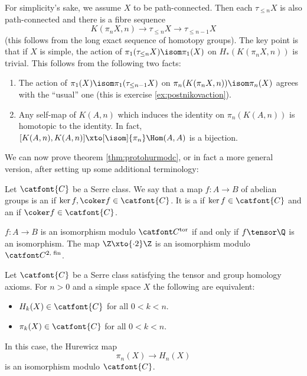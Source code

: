 For simplicity's sake, we assume $X$ to be path-connected.
Then each $\tau_{\leq n} X$ is also path-connected and there is a fibre sequence
\begin{equation*}
	K(\pi_n X, n) \to \tau_{\leq n} X \to \tau_{\leq n - 1} X
\end{equation*}
(this follows from the long exact sequence of homotopy groups).
The key point is that if $X$ is simple, the action of $\pi_1(\tau_{\leq n} X) \isom \pi_1(X)$ on $H_*(K(\pi_n X, n))$ is trivial.
This follows from the following two facts:
\begin{enumerate}
	\item The action of $\pi_1(X) \isom \pi_1(\tau_{\leq n - 1} X)$ on $\pi_n(K(\pi_n X, n)) \isom \pi_n(X)$ agrees with the \enquote{usual} one (this is exercise \ref{ex:postnikovaction}).
	\item Any self-map of $K(A, n)$ which induces the identity on $\pi_n(K(A, n))$ is homotopic to the identity.
		In fact, $[K(A, n), K(A, n)] \xto[\isom]{\pi_n} \Hom(A, A)$ is a bijection.
\end{enumerate}
We can now prove theorem \ref{thm:protohurmodc}, or in fact a more general version, after setting up some additional terminology:
\begin{definition}
	Let $\catfont{C}$ be a Serre class.
	We say that a map $f\colon A \to B$ of abelian groups is an  if $\ker f, \coker f \in \catfont{C}$.  
	It is a  if $\ker f \in \catfont{C}$ and an  if $\coker f \in \catfont{C}$.
\end{definition}
\begin{example}
	$f\colon A \to B$ is an isomorphism modulo $\Ctor$ if and only if $f \tensor \Q$ is an isomorphism.
	The map $\Z \xto{\cdot 2} \Z$ is an isomorphism modulo $\Cfinp[2]$.
\end{example}
\begin{theorem}
	Let $\catfont{C}$ be a Serre class satisfying the tensor and group homology axioms.
	For $n > 0$ and a simple space $X$ the following are equivalent:
	\begin{itemize}
		\item $H_k(X) \in \catfont{C}$ for all $0 < k < n$.
		\item $\pi_k(X) \in \catfont{C}$ for all $0 < k < n$.
	\end{itemize}
	In this case, the Hurewicz map 
	\begin{equation*}
		\pi_n(X) \to H_n(X)
	\end{equation*}
	is an isomorphism modulo $\catfont{C}$.
\end{theorem}
